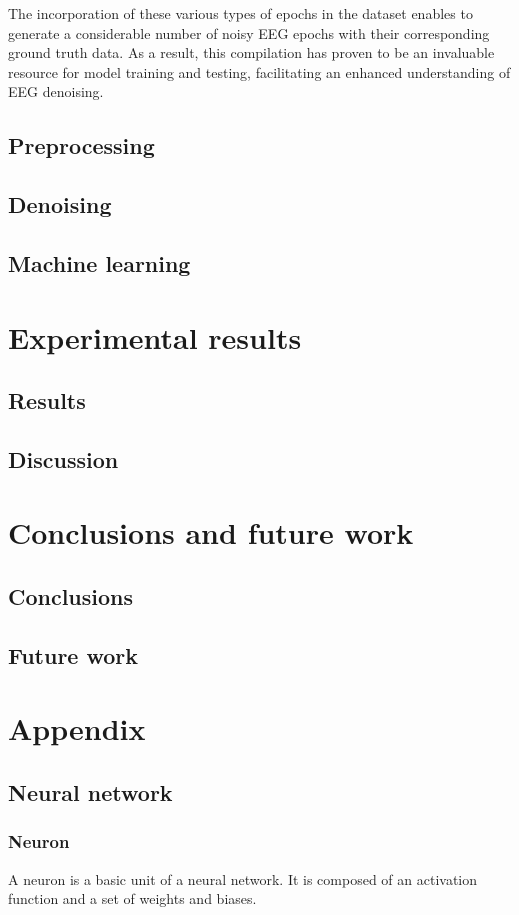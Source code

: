 \documentclass[a4paper]{sapthesis}
\begin{document}
The incorporation of these various types of epochs in the dataset
enables to generate a considerable number of noisy EEG epochs
with their corresponding ground truth data. As a result, this compilation 
has proven to be an invaluable resource for model training and testing,
 facilitating an enhanced understanding of EEG denoising.

\section{Preprocessing}
\section{Denoising}
\section{Machine learning}
\chapter{Experimental results}
\section{Results}
\section{Discussion}
\chapter{Conclusions and future work}
\section{Conclusions}
\section{Future work}
\chapter{Appendix}
\section {Neural network}
\subsection{Neuron}\label{sec:neuron}
A neuron is a basic unit of a neural network. It is composed of an
  activation function and a set of weights and biases.
\end{document}
